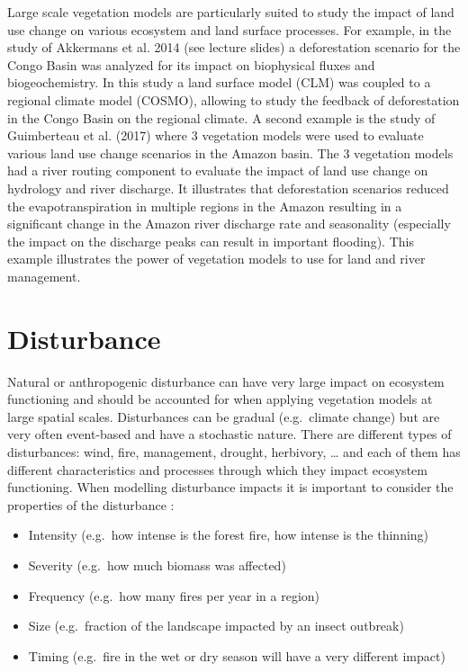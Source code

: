 \documentclass[12pt,oneside]{book}
\providecommand{\tightlist}{%
  \setlength{\itemsep}{0pt}\setlength{\parskip}{0pt}}
\begin{document}
Large scale vegetation models are particularly suited to study the
impact of land use change on various ecosystem and land surface
processes. For example, in the study of Akkermans et al. 2014 (see
lecture slides) a deforestation scenario for the Congo Basin was
analyzed for its impact on biophysical fluxes and biogeochemistry. In
this study a land surface model (CLM) was coupled to a regional climate
model (COSMO), allowing to study the feedback of deforestation in the
Congo Basin on the regional climate. A second example is the study of
Guimberteau et al. (2017) where 3 vegetation models were used to
evaluate various land use change scenarios in the Amazon basin. The 3
vegetation models had a river routing component to evaluate the impact
of land use change on hydrology and river discharge. It illustrates that
deforestation scenarios reduced the evapotranspiration in multiple
regions in the Amazon resulting in a significant change in the Amazon
river discharge rate and seasonality (especially the impact on the
discharge peaks can result in important flooding). This example
illustrates the power of vegetation models to use for land and river
management.

\section{Disturbance}\label{disturbance}

Natural or anthropogenic disturbance can have very large impact on
ecosystem functioning and should be accounted for when applying
vegetation models at large spatial scales. Disturbances can be gradual
(e.g.~climate change) but are very often event-based and have a
stochastic nature. There are different types of disturbances: wind,
fire, management, drought, herbivory, \ldots{} and each of them has
different characteristics and processes through which they impact
ecosystem functioning. When modelling disturbance impacts it is
important to consider the properties of the disturbance :

\begin{itemize}
\tightlist
\item
  Intensity (e.g.~how intense is the forest fire, how intense is the
  thinning)
\item
  Severity (e.g.~how much biomass was affected)
\item
  Frequency (e.g.~how many fires per year in a region)
\item
  Size (e.g.~fraction of the landscape impacted by an insect outbreak)
\item
  Timing (e.g.~fire in the wet or dry season will have a very different
  impact)
\end{itemize}
\end{document}
